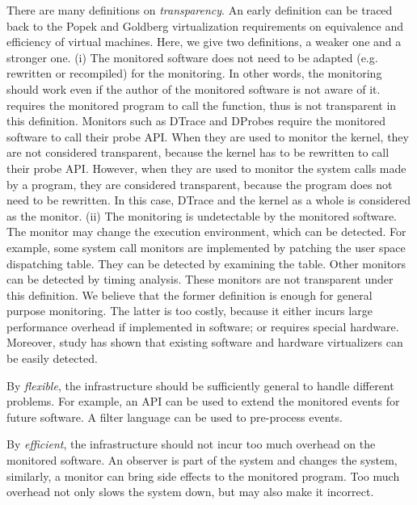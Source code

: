 There are many definitions on {\em transparency}.
An early definition can be traced back to the Popek and Goldberg
virtualization requirements \cite{popek1974formal} on
equivalence and efficiency of virtual machines.
Here, we give two definitions, a weaker one and a stronger one.
(i) The monitored software does not need to be adapted (e.g. rewritten or
recompiled) for the monitoring.
In other words, the monitoring should work even if the author of the
monitored software is not aware of it.
 requires the monitored program to call the
 function, thus  is not transparent
in this definition.
Monitors such as DTrace and DProbes require the monitored
software to call their probe API.
When they are used to monitor the kernel, they are not considered transparent,
because the kernel has to be rewritten to call their probe API.
However, when they are used to monitor the system calls made by a program,
they are considered transparent, because the program does not need to be
rewritten.
In this case, DTrace and the kernel as a whole is considered as the monitor.
(ii) The monitoring is undetectable by the monitored software.
The monitor may change the execution environment, which can be detected.
For example, some system call monitors are implemented by patching the
user space dispatching table.
They can be detected by examining the table.
Other monitors can be detected by timing analysis.
These monitors are not transparent under this definition.
We believe that the former definition is enough for general purpose monitoring.
The latter is too costly,
because it either incurs large performance overhead if implemented in software;
or requires special hardware.
Moreover, study \cite{raffetseder2007detecting} has shown that existing software
and hardware virtualizers can be easily detected.

By {\em flexible}, the infrastructure should be sufficiently general to
handle different problems.
For example, an API can be used to extend the monitored events for future software.
A filter language can be used to pre-process events.

By {\em efficient}, the infrastructure should not incur too much
overhead on the monitored software.
An observer is part of the system and changes the system, similarly,
a monitor can bring side effects to the monitored program.
Too much overhead not only slows the system down, but may also make
it incorrect.

